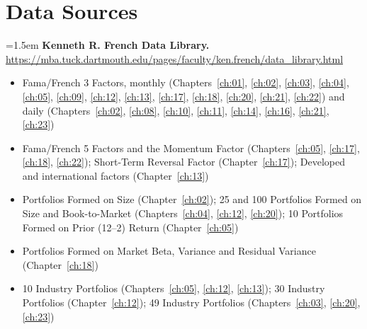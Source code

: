 \chapter*{Data Sources}
\label{datasources}


\begingroup
\small
\sloppy
\setlength{\parindent}{0pt}
\setlength{\parskip}{4pt}

\hangindent=1.5em \textbf{Kenneth R. French Data Library.} \url{https://mba.tuck.dartmouth.edu/pages/faculty/ken.french/data_library.html}
\begin{itemize}\setlength{\itemsep}{0pt}\setlength{\parskip}{0pt}
  \item Fama/French 3 Factors, monthly (Chapters~\ref{ch:01}, \ref{ch:02}, \ref{ch:03}, \ref{ch:04}, \ref{ch:05}, \ref{ch:09}, \ref{ch:12}, \ref{ch:13}, \ref{ch:17}, \ref{ch:18}, \ref{ch:20}, \ref{ch:21}, \ref{ch:22}) and daily (Chapters~\ref{ch:02}, \ref{ch:08}, \ref{ch:10}, \ref{ch:11}, \ref{ch:14}, \ref{ch:16}, \ref{ch:21}, \ref{ch:23})
  \item Fama/French 5 Factors and the Momentum Factor (Chapters~\ref{ch:05}, \ref{ch:17}, \ref{ch:18}, \ref{ch:22}); Short-Term Reversal Factor (Chapter~\ref{ch:17}); Developed and international factors (Chapter~\ref{ch:13})
  \item Portfolios Formed on Size (Chapter~\ref{ch:02}); 25 and 100 Portfolios Formed on Size and Book-to-Market (Chapters~\ref{ch:04}, \ref{ch:12}, \ref{ch:20}); 10 Portfolios Formed on Prior (12--2) Return (Chapter~\ref{ch:05})
  \item Portfolios Formed on Market Beta, Variance and Residual Variance (Chapter~\ref{ch:18})
  \item 10 Industry Portfolios (Chapters~\ref{ch:05}, \ref{ch:12}, \ref{ch:13}); 30 Industry Portfolios (Chapter~\ref{ch:12}); 49 Industry Portfolios (Chapters~\ref{ch:03}, \ref{ch:20}, \ref{ch:23})
\end{itemize}

